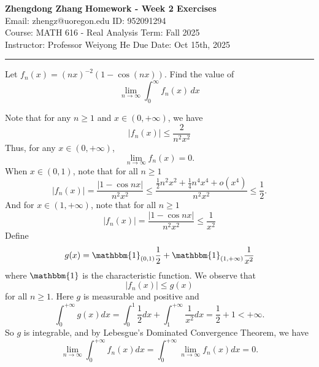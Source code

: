 \documentclass[letterpaper, 12pt]{article}
\begin{document}
\noindent
\large\textbf{Zhengdong Zhang} \hfill \textbf{Homework - Week 2 Exercises}   \\
Email: zhengz@uoregon.edu \hfill ID: 952091294 \\
\normalsize Course: MATH 616 - Real Analysis \hfill Term: Fall 2025 \\
Instructor: Professor Weiyong He \hfill Due Date: Oct 15th, 2025 \\
\noindent\rule{7in}{2.8pt}
\begin{problem}{1.0}
Let \(f_n(x)=(nx)^{-2}(1-\cos(nx))\). Find the value of 
\[\lim_{n\to \infty}\int_{0}^{\infty} f_n(x)  \,dx \]
\end{problem}
\begin{solution}
Note that for any \(n\geq 1\) and \(x\in (0,+\infty)\), we have 
\[|f_n(x)|\leq \frac{2}{n^2x^2}\]
Thus, for any \(x\in (0,+\infty)\), 
\[\lim_{n\to \infty}f_n(x)=0.\]
When \(x\in (0,1)\), note that for all \(n\geq 1\)
\[|f_n(x)|=\frac{|1-\cos nx|}{n^2x^2}\leq \frac{\frac{1}{2}n^2x^2+\frac{1}{4}n^4x^4+o(x^4)}{n^2x^2}\leq \frac{1}{2}.\]
And for \(x\in (1,+\infty)\), note that for all \(n\geq 1\)
\[|f_n(x)|=\frac{|1-\cos nx|}{n^2x^2}\leq \frac{1}{x^2}\]
Define 
\[g(x)=\mathbbm{1}_{(0,1)}\frac{1}{2}+\mathbbm{1}_{(1,+\infty)}\frac{1}{x^2}\]
where \(\mathbbm{1}\) is the characteristic function. We observe that
\[|f_n(x)|\leq g(x)\]
for all \(n\geq 1\). Here \(g\) is measurable and positive and 
\[\int_{0}^{+\infty}g(x)dx=\int_{0}^{1}\frac{1}{2}dx+\int_{1}^{+\infty}\frac{1}{x^2}dx=\frac{1}{2}+1<+\infty.\]
So \(g\) is integrable, and by Lebesgue's Dominated Convergence Theorem, we have 
\[\lim_{n\to \infty}\int_{0}^{+\infty}f_n(x)dx=\int_{0}^{+\infty}\lim_{n\to \infty}f_n(x)dx=0.\]
\end{solution}
\end{document}
